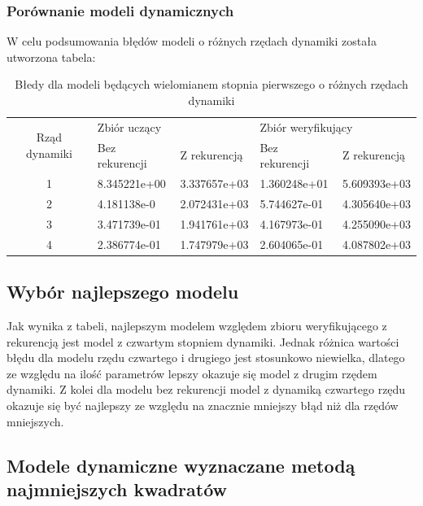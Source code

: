 \documentclass[a4paper, 11pt]{article}
\begin{document}
\subsubsection{Porównanie modeli dynamicznych}
W celu podsumowania błędów modeli o różnych rzędach dynamiki została utworzona tabela: 
\begin{table}[H]
\centering
\caption{Błedy dla modeli będących wielomianem stopnia pierwszego o różnych rzędach dynamiki}
\label{my-label}
\begin{tabular}{|c|l|l|l|l|}
\hline
\multirow{2}{*}{Rząd dynamiki} & \multicolumn{2}{l|}{Zbiór uczący} & \multicolumn{2}{l|}{Zbiór weryfikujący} \\ \cline{2-5} 
                               & Bez rekurencji   & Z rekurencją   & Bez rekurencji      & Z rekurencją      \\ \hline
1                              & 8.345221e+00      & 3.337657e+03   & 1.360248e+01        & 5.609393e+03       \\ \hline
2                              & 4.181138e-0     & 2.072431e+03    & 5.744627e-01        & 4.305640e+03       \\ \hline
3                              & 3.471739e-01    & 1.941761e+03    & 4.167973e-01        &  4.255090e+03      \\ \hline
4                              & 2.386774e-01     & 1.747979e+03    & 2.604065e-01         & 4.087802e+03      \\ \hline
\end{tabular}
\end{table}



\subsection{Wybór najlepszego modelu}
Jak wynika z tabeli, najlepszym modelem względem zbioru weryfikującego z rekurencją jest model z czwartym stopniem dynamiki. Jednak różnica wartości błędu dla modelu rzędu czwartego i drugiego jest stosunkowo niewielka, dlatego ze względu na ilość parametrów lepszy okazuje się model z drugim rzędem dynamiki. Z kolei dla modelu bez rekurencji model z dynamiką czwartego rzędu okazuje się być najlepszy ze względu na znacznie mniejszy błąd niż dla rzędów mniejszych.

\subsection{Modele dynamiczne wyznaczane metodą najmniejszych kwadratów} 
\end{document}
